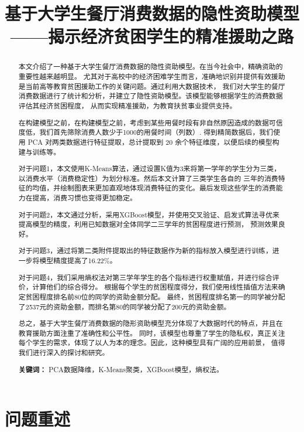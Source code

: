 \documentclass{article}
\title{\textbf{基于大学生餐厅消费数据的隐性资助模型\\——揭示经济贫困学生的精准援助之路}}
\date{} %
\begin{document}
\maketitle

\begin{abstract}
本文介绍了一种基于大学生餐厅消费数据的隐性资助模型。在当今社会中，精确资助的重要性越来越明显。
尤其对于高校中的经济困难学生而言，准确地识别并提供有效援助是当前高等教育贫困援助工作的关键问题。通过利用大数据技术，
我们对大学生的餐厅消费数据进行了统计和分析，并建立了隐性资助模型。该模型能够根据学生的消费数据评估其经济贫困程度，
从而实现精准援助，为教育扶贫事业提供支持。

在构建模型之前，在构建模型之前，考虑到某些用餐时段有非自然原因造成的数据可信度低，我们首先筛除消费人数少于1000的用餐时间（列数）.
得到精简数据后，我们使用 PCA 对两类数据进行特征提取，总计提取到 20 余个特征维度，以便后续的模型构建与训练等。

对于问题1，本文使用K-Means算法，通过设置K值为3来将第一学年的学生分为三类，以消费水平（消费稳定性）为划分标准。然后本文计算了三类学生各自的
三年的消费特征的均值，并绘制图表来更加直观地体现消费特征的变化。最后发现这些学生的消费能力在提高，消费习惯也变得更加稳定。

对于问题2，本文通过分析，采用XGBoost模型，并使用交叉验证、启发式算法寻优来提高模型的精度，利用已知数据对全体同学二三学年的贫困程度进行预测，
预测效果良好。

对于问题3，通过将第二类附件提取出的特征数据作为新的指标放入模型进行训练，进一步将模型精度提高了16.22\%。

对于问题4，我们采用熵权法对第三学年学生的各个指标进行权重赋值，并进行综合评价，计算他们的综合得分。
根据每个学生的贫困程度得分，我们使用线性插值方法来确定贫困程度排名前80位的同学的资助金额分配。
最终，贫困程度排名第一的同学被分配了2537元的资助金额，而排名第80的同学被分配了200元的资助金额。

总之，基于大学生餐厅消费数据的隐形资助模型充分体现了大数据时代的特点，并且在教育援助方面注重了准确性和公平性。
同时，该模型也尊重了学生的隐私权，真正关注每个学生的需求，体现了以人为本的理念。因此，这种模型具有广阔的应用前景，
值得我们进行深入的探讨和研究。

\textbf{关键词：} PCA数据降维，K-Means聚类，XGBoost模型，熵权法。
\end{abstract}

\section{问题重述}
\end{document}
